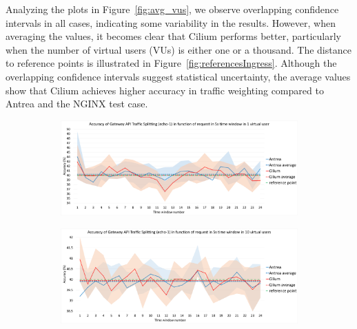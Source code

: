Analyzing the plots in Figure~\ref{fig:avg_vus}, we observe overlapping confidence intervals in all cases, indicating some variability in the results. However, when averaging the values, it becomes clear that Cilium performs better, particularly when the number of virtual users (VUs) is either one or a thousand. The distance to reference points is illustrated in Figure~\ref{fig:referencesIngress}. Although the overlapping confidence intervals suggest statistical uncertainty, the average values show that Cilium achieves higher accuracy in traffic weighting compared to Antrea and the NGINX test case.


\begin{figure}[H]
    \centering
    \begin{subfigure}[b]{0.85\textwidth}
        \includegraphics[width=\textwidth]{plots/traffic-splitting/time_window_5_1vu_cloud.png}
        \label{fig:time_window_1vu}
    \end{subfigure}

    \vspace{-0.5cm}

    \begin{subfigure}[b]{0.85\textwidth}
        \includegraphics[width=\textwidth]{plots/traffic-splitting/time_window_5_10vu_cloud.png}
        \label{fig:time_window_10vu}
    \end{subfigure}

    \vspace{-0.5cm}


\end{figure}
